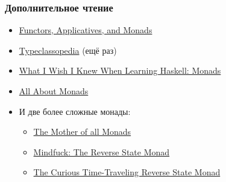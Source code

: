 \documentclass[11pt]{beamer}
\begin{document}
\begin{frame}[fragile]
\frametitle{Дополнительное чтение}
\begin{itemize}
    \item \href{https://www.snoyman.com/blog/2017/01/functors-applicatives-and-monads}{Functors, Applicatives, and Monads}
    \item \href{https://wiki.haskell.org/Typeclassopedia}{Typeclassopedia} (ещё раз)
    \item \href{http://dev.stephendiehl.com/hask/#monads}{What I Wish I Knew When Learning Haskell: Monads}
    \item \href{https://wiki.haskell.org/All_About_Monads}{All About Monads}
    \item И две более сложные монады:
    \begin{itemize}
        \item \href{http://blog.sigfpe.com/2008/12/mother-of-all-monads.html}{The Mother of all Monads}
        \item \href{https://lukepalmer.wordpress.com/2008/08/10/mindfuck-the-reverse-state-monad/}{Mindfuck: The Reverse State Monad}
        \item \href{https://tech-blog.capital-match.com/posts/5-the-reverse-state-monad.html}{The Curious Time-Traveling Reverse State Monad}
    \end{itemize}
\end{itemize}
\end{frame}
\end{document}
